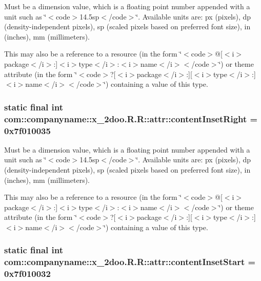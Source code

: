 Must be a dimension value, which is a floating point number appended with a unit such as \char`\"{}$<$code$>$14.5sp$<$/code$>$\char`\"{}. Available units are: px (pixels), dp (density-independent pixels), sp (scaled pixels based on preferred font size), in (inches), mm (millimeters). 

This may also be a reference to a resource (in the form \char`\"{}$<$code$>$@\mbox{[}$<$i$>$package$<$/i$>$:\mbox{]}$<$i$>$type$<$/i$>$:$<$i$>$name$<$/i$>$$<$/code$>$\char`\"{}) or theme attribute (in the form \char`\"{}$<$code$>$?\mbox{[}$<$i$>$package$<$/i$>$:\mbox{]}\mbox{[}$<$i$>$type$<$/i$>$:\mbox{]}$<$i$>$name$<$/i$>$$<$/code$>$\char`\"{}) containing a value of this type. \hypertarget{classcom_1_1companyname_1_1x__2doo_1_1_r_1_1attr_3801fe95544dbee5dc1389c679f984f6}{
\subsubsection[{contentInsetRight}]{\setlength{\rightskip}{0pt plus 5cm}static final int com::companyname::x\_\-2doo.R.R::attr::contentInsetRight = 0x7f010035}}
\label{classcom_1_1companyname_1_1x__2doo_1_1_r_1_1attr_3801fe95544dbee5dc1389c679f984f6}


Must be a dimension value, which is a floating point number appended with a unit such as \char`\"{}$<$code$>$14.5sp$<$/code$>$\char`\"{}. Available units are: px (pixels), dp (density-independent pixels), sp (scaled pixels based on preferred font size), in (inches), mm (millimeters). 

This may also be a reference to a resource (in the form \char`\"{}$<$code$>$@\mbox{[}$<$i$>$package$<$/i$>$:\mbox{]}$<$i$>$type$<$/i$>$:$<$i$>$name$<$/i$>$$<$/code$>$\char`\"{}) or theme attribute (in the form \char`\"{}$<$code$>$?\mbox{[}$<$i$>$package$<$/i$>$:\mbox{]}\mbox{[}$<$i$>$type$<$/i$>$:\mbox{]}$<$i$>$name$<$/i$>$$<$/code$>$\char`\"{}) containing a value of this type. \hypertarget{classcom_1_1companyname_1_1x__2doo_1_1_r_1_1attr_05ae6bcbd33b64b9f8c45fb31e7ed017}{
\subsubsection[{contentInsetStart}]{\setlength{\rightskip}{0pt plus 5cm}static final int com::companyname::x\_\-2doo.R.R::attr::contentInsetStart = 0x7f010032}}
\label{classcom_1_1companyname_1_1x__2doo_1_1_r_1_1attr_05ae6bcbd33b64b9f8c45fb31e7ed017}



